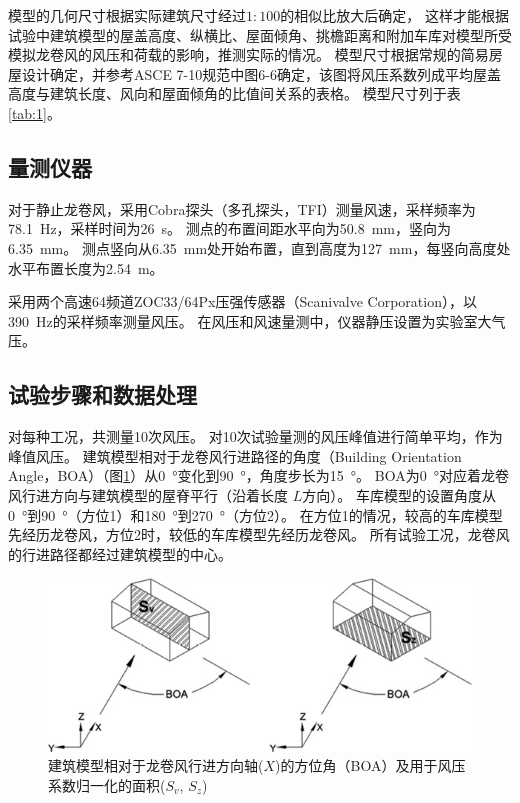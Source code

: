 \documentclass{ctexart}
\begin{document}
模型的几何尺寸根据实际建筑尺寸经过$1:100$的相似比放大后确定，
这样才能根据试验中建筑模型的屋盖高度、纵横比、屋面倾角、挑檐距离和附加车库对模型所受模拟龙卷风的风压和荷载的影响，推测实际的情况。
模型尺寸根据常规的简易房屋设计确定，并参考ASCE 7-10规范中图6-6\cite{american1994minimum}确定，该图将风压系数列成平均屋盖高度与建筑长度、风向和屋面倾角的比值间关系的表格。
模型尺寸列于表\ref{tab:1}。

\begin{table}\label{tab:1}
\end{table}


\subsection{量测仪器}
对于静止龙卷风，采用Cobra探头（多孔探头，TFI\textregistered ）测量风速，采样频率为\SI{78.1}{Hz}，采样时间为\SI{26}{s}。
测点的布置间距水平向为\SI{50.8}{mm}，竖向为\SI{6.35}{mm}。
测点竖向从\SI{6.35}{mm}处开始布置，直到高度为\SI{127}{mm}，每竖向高度处水平布置长度为\SI{2.54}{m}。

采用两个高速64频道ZOC33/64Px压强传感器（Scanivalve Corporation\textregistered ），以\SI{390}{Hz}的采样频率测量风压。
在风压和风速量测中，仪器静压设置为实验室大气压。

\subsection{试验步骤和数据处理}
对每种工况，共测量10次风压。
对10次试验量测的风压峰值进行简单平均，作为峰值风压。
建筑模型相对于龙卷风行进路径的角度（Building Orientation Angle，BOA）（图\ref{fig:BOA}）从\SI{0}{\degree}变化到\SI{90}{\degree}，角度步长为\SI{15}{\degree}。
BOA为\SI{0}{\degree}对应着龙卷风行进方向与建筑模型的屋脊平行（沿着长度 $L$方向）。
车库模型的设置角度从\SI{0}{\degree}到\SI{90}{\degree}（方位1）和\SI{180}{\degree}到\SI{270}{\degree}（方位2）。
在方位1的情况，较高的车库模型先经历龙卷风，方位2时，较低的车库模型先经历龙卷风。
所有试验工况，龙卷风的行进路径都经过建筑模型的中心。

\begin{figure}
\centering
\includegraphics{./fig/3}
\caption{建筑模型相对于龙卷风行进方向轴($X$)的方位角（BOA）及用于风压系数归一化的面积($S_v$, $S_z$)}
\label{fig:BOA}
\end{figure}
\end{document}

